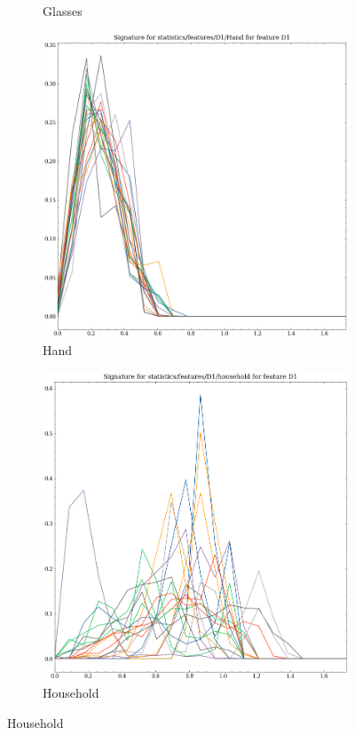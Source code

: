 \begin{figure}[t!p]
\begin{subfigure}[b]{0.23\textwidth}
        \caption{Glasses}
        \label{fig:features-statistics-D1-n}    
    \end{subfigure}
    \hfill
    \begin{subfigure}[b]{0.23\textwidth}
        \includegraphics[width=\textwidth]{assets/feature_extraction/D1/Hand.png}
        \caption{Hand}
        \label{fig:features-statistics-D1-o}    
    \end{subfigure}
    \hfill
    \begin{subfigure}[b]{0.23\textwidth}
        \includegraphics[width=\textwidth]{assets/feature_extraction/D1/household.png}
        \caption{Household}
        \label{fig:features-statistics-D1-p}    
    \end{subfigure}
    \hfill


\end{figure}
